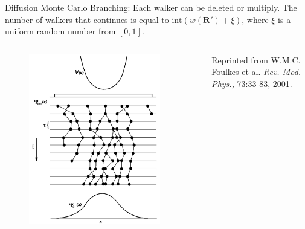 \documentclass{beamer}
\newcommand{\R}{\mathbf{R}}
\begin{document}
\begin{frame}{Diffusion Monte Carlo}
Branching: Each walker can be deleted or multiply. The number of walkers that continues is equal to $\mathrm{int}\left(w(\R')+\xi\right)$, where $\xi$ is a uniform random number from $[0,1]$.
\begin{columns}
\begin{column}{0.4\textwidth}
\begin{figure}
   \includegraphics[width=0.9\textwidth]{../figures/branching.png}
\end{figure}
\end{column}
\begin{column}{0.7\textwidth}
   {\color{blue}{Figure:}} Reprinted from W.M.C. Foulkes et al. \textit{Rev. Mod. Phys.,} 73:33-83, 2001.
\end{column}
\end{columns}
\end{frame}
\end{document}
